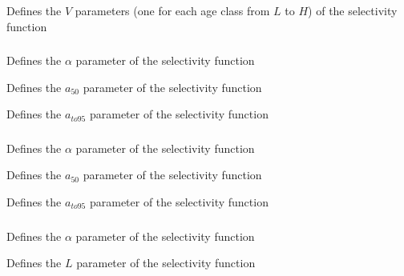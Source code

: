  {Defines the $V$ parameters (one for each age class from $L$ to $H$) of the selectivity function}

\subsubsection[Logistic]{}

 {Defines the $\alpha$ parameter of the selectivity function}

 {Defines the $a_{50}$ parameter of the selectivity function}

 {Defines the $a_{to95}$ parameter of the selectivity function}

\subsubsection[InverseLogistic]{}

 {Defines the $\alpha$ parameter of the selectivity function}

 {Defines the $a_{50}$ parameter of the selectivity function}

 {Defines the $a_{to95}$ parameter of the selectivity function}

\subsubsection[Logistic producing]{}

 {Defines the $\alpha$ parameter of the selectivity function}

 {Defines the $L$ parameter of the selectivity function}

